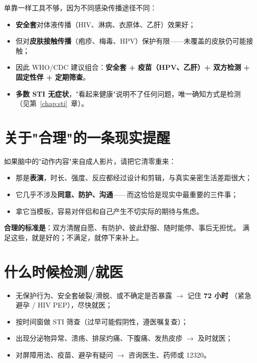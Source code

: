 \documentclass[12pt,UTF8,openany]{ctexbook}
\begin{document}
单靠一样工具不够，因为不同感染传播途径不同：

\begin{itemize}[leftmargin=2em]
  \item \textbf{安全套}对体液传播（HIV、淋病、衣原体、乙肝）效果好；
  \item 但对\textbf{皮肤接触传播}（疱疹、梅毒、HPV）保护有限——未覆盖的皮肤仍可能接触；
  \item 因此 WHO/CDC 建议组合：\textbf{安全套 + 疫苗（HPV、乙肝）+ 双方检测 + 固定性伴 + 定期筛查}。
  \item \textbf{多数 STI 无症状}，"看起来健康"说明不了任何问题，唯一确知方式是检测
        （见第~\ref{chap:sti}~章）。
\end{itemize}

\section{关于"合理"的一条现实提醒}

如果脑中的"动作内容"来自成人影片，请把它清零重来：

\begin{itemize}[leftmargin=2em]
  \item 那是\textbf{表演}，时长、强度、反应都经过设计和剪辑，与真实亲密生活差距很大；
  \item 它几乎不涉及\textbf{同意、防护、沟通}——而这恰恰是现实中最重要的三件事；
  \item 拿它当模板，容易对伴侣和自己产生不切实际的期待与焦虑。
\end{itemize}

\textbf{合理的标准是}：双方清醒自愿、有防护、彼此舒服、随时能停、事后无担忧。
满足这些，就是好的；不满足，就停下来补上。

\section{什么时候检测/就医}

\begin{itemize}[leftmargin=2em]
  \item 无保护行为、安全套破裂/滑脱、或不确定是否暴露 $\to$ 记住 \textbf{72 小时}
        （紧急避孕 / HIV PEP），尽快就医；
  \item 按时间窗做 STI 筛查（过早可能假阴性，遵医嘱复查）；
  \item 出现分泌物异常、溃疡、排尿灼痛、下腹痛、发热皮疹 $\to$ 及时就医；
  \item 对屏障用法、疫苗、避孕有疑问 $\to$ 咨询医生、药师或 12320。
\end{itemize}
\end{document}
